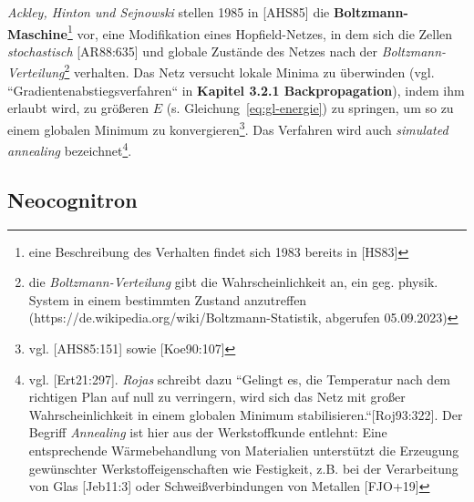 \textit{Ackley, Hinton und Sejnowski} stellen 1985 in [AHS85] die \textbf{Boltzmann-Maschine}\footnote{
    eine Beschreibung des Verhalten findet sich 1983 bereits in [HS83]
} vor, eine Modifikation eines Hopfield-Netzes, in dem sich die Zellen \textit{stochastisch} [AR88:635] und globale Zustände des Netzes nach der \textit{Boltzmann-Verteilung}\footnote{
    die \textit{Boltzmann-Verteilung} gibt die Wahrscheinlichkeit an, ein geg. physik. System in einem bestimmten Zustand anzutreffen (https://de.wikipedia.org/wiki/Boltzmann-Statistik, abgerufen  05.09.2023)
} verhalten. Das Netz versucht lokale Minima zu überwinden (vgl. ``Gradientenabstiegsverfahren`` in \textbf{Kapitel 3.2.1 Backpropagation}), indem ihm erlaubt wird, zu größeren $E$ (s. Gleichung~\ref{eq:gl-energie}) zu springen, um so zu einem globalen Minimum zu konvergieren\footnote{vgl. [AHS85:151] sowie [Koe90:107]}.
Das Verfahren wird auch \textit{simulated annealing} bezeichnet\footnote{vgl. [Ert21:297]. \textit{Rojas} schreibt dazu
    ``Gelingt es, die Temperatur nach dem richtigen Plan auf null zu verringern, wird sich das Netz mit großer Wahrscheinlichkeit in einem globalen Minimum stabilisieren.``[Roj93:322]. Der Begriff \textit{Annealing} ist hier aus der Werkstoffkunde entlehnt: Eine entsprechende Wärmebehandlung von Materialien unterstützt die Erzeugung gewünschter Werkstoffeigenschaften wie Festigkeit, z.B.  bei der Verarbeitung von Glas [Jeb11:3] oder Schweißverbindungen von Metallen [FJO+19]
}.

\subsection{Neocognitron}

